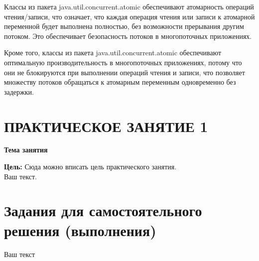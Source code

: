 Классы из пакета java.util.concurrent.atomic обеспечивают атомарность операций чтения/записи, что означает, что каждая операция чтения или записи к атомарной переменной будет выполнена полностью, без возможности прерывания другим потоком. Это обеспечивает безопасность потоков в многопоточных приложениях.

Кроме того, классы из пакета java.util.concurrent.atomic обеспечивают оптимальную производительность в многопоточных приложениях, потому что они не блокируются при выполнении операций чтения и записи, что позволяет множеству потоков обращаться к атомарным переменным одновременно без задержки.
\newpage%
\section*{ПРАКТИЧЕСКОЕ ЗАНЯТИЕ 1}%
 \vspace{-10pt}%
\begin{center}%
 {\bf%
 Тема занятия}
\end{center}%

{\bf Цель:} Сюда можно вписать цель практического занятия.
\\%

Ваш текст.

\newpage%
\section*{Задания для самостоятельного решения (выполнения)}%

Ваш текст

\newpage%

